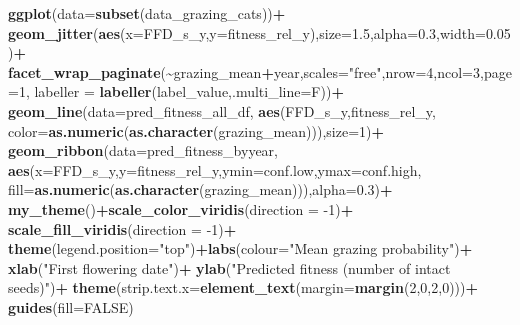 \documentclass[
]{article}
\newenvironment{Shaded}{\begin{snugshade}}{\end{snugshade}}
\newcommand{\DataTypeTok}[1]{\textcolor[rgb]{0.13,0.29,0.53}{#1}}
\newcommand{\DecValTok}[1]{\textcolor[rgb]{0.00,0.00,0.81}{#1}}
\newcommand{\FloatTok}[1]{\textcolor[rgb]{0.00,0.00,0.81}{#1}}
\newcommand{\KeywordTok}[1]{\textcolor[rgb]{0.13,0.29,0.53}{\textbf{#1}}}
\newcommand{\NormalTok}[1]{#1}
\newcommand{\OperatorTok}[1]{\textcolor[rgb]{0.81,0.36,0.00}{\textbf{#1}}}
\newcommand{\OtherTok}[1]{\textcolor[rgb]{0.56,0.35,0.01}{#1}}
\newcommand{\StringTok}[1]{\textcolor[rgb]{0.31,0.60,0.02}{#1}}
\begin{document}
\begin{Shaded}
\begin{Highlighting}[]
\KeywordTok{ggplot}\NormalTok{(}\DataTypeTok{data=}\KeywordTok{subset}\NormalTok{(data\_grazing\_cats))}\OperatorTok{+}
\StringTok{  }\KeywordTok{geom\_jitter}\NormalTok{(}\KeywordTok{aes}\NormalTok{(}\DataTypeTok{x=}\NormalTok{FFD\_s\_y,}\DataTypeTok{y=}\NormalTok{fitness\_rel\_y),}\DataTypeTok{size=}\FloatTok{1.5}\NormalTok{,}\DataTypeTok{alpha=}\FloatTok{0.3}\NormalTok{,}\DataTypeTok{width=}\FloatTok{0.05}\NormalTok{)}\OperatorTok{+}
\StringTok{  }\KeywordTok{facet\_wrap\_paginate}\NormalTok{(}\OperatorTok{\textasciitilde{}}\NormalTok{grazing\_mean}\OperatorTok{+}\NormalTok{year,}\DataTypeTok{scales=}\StringTok{"free"}\NormalTok{,}\DataTypeTok{nrow=}\DecValTok{4}\NormalTok{,}\DataTypeTok{ncol=}\DecValTok{3}\NormalTok{,}\DataTypeTok{page=}\DecValTok{1}\NormalTok{,}
             \DataTypeTok{labeller =} \KeywordTok{labeller}\NormalTok{(label\_value,}\DataTypeTok{.multi\_line=}\NormalTok{F))}\OperatorTok{+}
\StringTok{  }\KeywordTok{geom\_line}\NormalTok{(}\DataTypeTok{data=}\NormalTok{pred\_fitness\_all\_df,}
            \KeywordTok{aes}\NormalTok{(FFD\_s\_y,fitness\_rel\_y,}
                \DataTypeTok{color=}\KeywordTok{as.numeric}\NormalTok{(}\KeywordTok{as.character}\NormalTok{(grazing\_mean))),}\DataTypeTok{size=}\DecValTok{1}\NormalTok{)}\OperatorTok{+}
\StringTok{  }\KeywordTok{geom\_ribbon}\NormalTok{(}\DataTypeTok{data=}\NormalTok{pred\_fitness\_byyear,}
            \KeywordTok{aes}\NormalTok{(}\DataTypeTok{x=}\NormalTok{FFD\_s\_y,}\DataTypeTok{y=}\NormalTok{fitness\_rel\_y,}\DataTypeTok{ymin=}\NormalTok{conf.low,}\DataTypeTok{ymax=}\NormalTok{conf.high,}
                \DataTypeTok{fill=}\KeywordTok{as.numeric}\NormalTok{(}\KeywordTok{as.character}\NormalTok{(grazing\_mean))),}\DataTypeTok{alpha=}\FloatTok{0.3}\NormalTok{)}\OperatorTok{+}
\StringTok{  }\KeywordTok{my\_theme}\NormalTok{()}\OperatorTok{+}\KeywordTok{scale\_color\_viridis}\NormalTok{(}\DataTypeTok{direction =} \DecValTok{{-}1}\NormalTok{)}\OperatorTok{+}
\StringTok{  }\KeywordTok{scale\_fill\_viridis}\NormalTok{(}\DataTypeTok{direction =} \DecValTok{{-}1}\NormalTok{)}\OperatorTok{+}
\StringTok{  }\KeywordTok{theme}\NormalTok{(}\DataTypeTok{legend.position=}\StringTok{"top"}\NormalTok{)}\OperatorTok{+}\KeywordTok{labs}\NormalTok{(}\DataTypeTok{colour=}\StringTok{"Mean grazing probability"}\NormalTok{)}\OperatorTok{+}
\StringTok{  }\KeywordTok{xlab}\NormalTok{(}\StringTok{"First flowering date"}\NormalTok{)}\OperatorTok{+}
\StringTok{  }\KeywordTok{ylab}\NormalTok{(}\StringTok{"Predicted fitness (number of intact seeds)"}\NormalTok{)}\OperatorTok{+}
\StringTok{  }\KeywordTok{theme}\NormalTok{(}\DataTypeTok{strip.text.x=}\KeywordTok{element\_text}\NormalTok{(}\DataTypeTok{margin=}\KeywordTok{margin}\NormalTok{(}\DecValTok{2}\NormalTok{,}\DecValTok{0}\NormalTok{,}\DecValTok{2}\NormalTok{,}\DecValTok{0}\NormalTok{)))}\OperatorTok{+}
\StringTok{  }\KeywordTok{guides}\NormalTok{(}\DataTypeTok{fill=}\OtherTok{FALSE}\NormalTok{)}
\end{Highlighting}
\end{Shaded}
\end{document}
